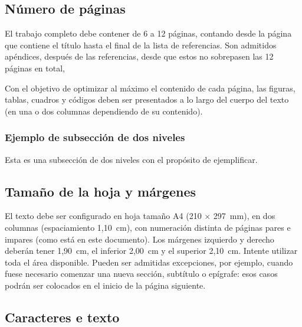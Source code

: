 \documentclass[12pt, a4paper, twoside, twocolumn]{article}
\begin{document}
	
\subsection{Número de páginas}

El trabajo completo debe contener de 6 a 12 páginas, contando desde la página que contiene el título hasta el final de la lista de referencias. Son admitidos apéndices, después de las referencias, desde que estos no sobrepasen las 12 páginas en total,

Con el objetivo de optimizar al máximo el contenido de cada página, las figuras, tablas, cuadros y códigos deben ser presentados a lo largo del cuerpo del texto (en una o dos columnas dependiendo de su contenido).

\subsubsection{Ejemplo de subsección de dos niveles}

Esta es una subsección de dos niveles con el propósito de ejemplificar.

\subsection{Tamaño de la hoja y márgenes}

El texto debe ser configurado en hoja tamaño A4 (210 $\times$ 297~mm), en dos columnas (espaciamiento 1,10~cm), con numeración distinta de páginas pares e impares (como está en este documento). Los márgenes izquierdo y derecho deberán tener 1,90~cm, el inferior 2,00~cm  y el superior 2,10~cm. Intente utilizar toda el área disponible. Pueden ser admitidas excepciones, por ejemplo, cuando fuese necesario comenzar una nueva sección, subtítulo o epígrafe: esos casos podrán ser colocados en el inicio de la página siguiente.

\subsection{Caracteres e texto}
\end{document}
